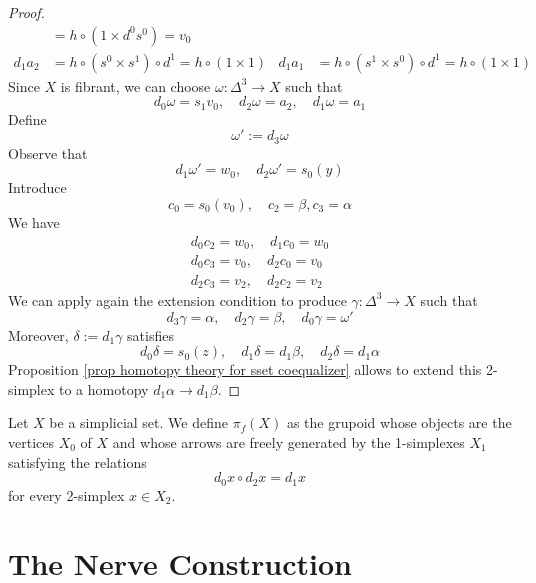 \begin{proof}
\begin{align*}
& = h \circ (1 \times d^0 s^0) = v_0 \\
d_1 a_2 & = h \circ (s^0 \times s^1) \circ d^1 = h \circ (1 \times 1) & d_1 a_1 & = h \circ (s^1 \times s^0) \circ d^1 = h \circ (1 \times 1)
\end{align*}
Since $X$ is fibrant, we can choose $\omega \colon \Delta^3 \to X$ such that
\[
d_0 \omega = s_1 v_0, \quad d_2 \omega = a_2, \quad d_1 \omega = a_1
\]
Define
\[
\omega' := d_3 \omega
\]
Observe that
\[
d_1 \omega' = w_0, \quad d_2 \omega' = s_0(y)
\]
Introduce
\[
c_0 = s_0(v_0), \quad c_2 = \beta, c_3 = \alpha
\]
We have
\begin{gather*}
d_0 c_2 = w_0, \quad d_1 c_0 = w_0 \\
d_0 c_3 = v_0, \quad d_2 c_0 = v_0 \\
d_2 c_3 = v_2, \quad d_2 c_2 = v_2
\end{gather*}
We can apply again the extension condition to produce $\gamma \colon \Delta^3 \to X$ such that
\[
d_3 \gamma = \alpha, \quad d_2 \gamma = \beta, \quad d_0 \gamma = \omega'
\]
Moreover, $\delta := d_1 \gamma$ satisfies
\[
d_0 \delta = s_0(z), \quad d_1 \delta = d_1 \beta, \quad d_2 \delta = d_1 \alpha
\]
Proposition \ref{prop homotopy theory for sset coequalizer} allows to extend this 2-simplex to a homotopy $d_1 \alpha \to d_1 \beta$.
\end{proof}

\begin{defin}
Let $X$ be a simplicial set. We define $\pi_f(X)$ as the grupoid whose objects are the vertices $X_0$ of $X$ and whose arrows are freely generated by the 1-simplexes $X_1$ satisfying the relations
\[
d_0 x \circ d_2 x = d_1 x
\]
for every 2-simplex $x \in X_2$.
\end{defin}



\section{The Nerve Construction}

